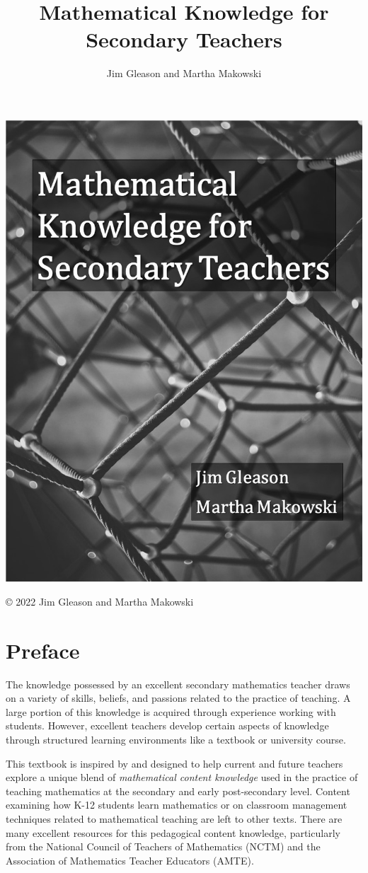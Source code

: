 \documentclass[
]{book}
\title{Mathematical Knowledge for Secondary Teachers}
\author{Jim Gleason and Martha Makowski}
\date{}
\theoremstyle{definition}
\theoremstyle{definition}
\theoremstyle{definition}
\theoremstyle{definition}
\theoremstyle{remark}
\begin{document}
\maketitle

{
\setcounter{tocdepth}{1}
\tableofcontents
}
\hypertarget{section}{%
\chapter*{}\label{section}}

\begin{center}\includegraphics[width=0.5\linewidth]{images/Cover} \end{center}

© 2022 Jim Gleason and Martha Makowski

\hypertarget{preface}{%
\chapter*{Preface}\label{preface}}

The knowledge possessed by an excellent secondary mathematics teacher draws on a variety of skills, beliefs, and passions related to the practice of teaching. A large portion of this knowledge is acquired through experience working with students. However, excellent teachers develop certain aspects of knowledge through structured learning environments like a textbook or university course.

This textbook is inspired by \citet{Usiskin2003} and designed to help current and future teachers explore a unique blend of \emph{mathematical content knowledge} used in the practice of teaching mathematics at the secondary and early post-secondary level. Content examining how K-12 students learn mathematics or on classroom management techniques related to mathematical teaching are left to other texts. There are many excellent resources for this pedagogical content knowledge, particularly from the National Council of Teachers of Mathematics (NCTM) and the Association of Mathematics Teacher Educators (AMTE).
\end{document}
